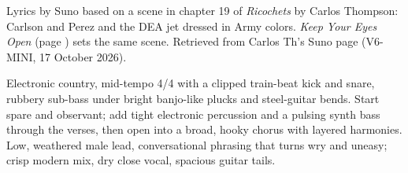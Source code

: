 
\label{sec:wrong-enough}
\begin{notes}
Lyrics by Suno based on a scene in chapter 19 of \emph{Ricochets} by Carlos Thompson: Carlson and Perez and the DEA jet dressed in Army colors. \emph{Keep Your Eyes Open} (page \pageref{sec:keep-your-eyes-open}) sets the same scene. Retrieved from Carlos Th's Suno page (V6-MINI, 17 October 2026).
\end{notes}
\begin{style}
Electronic country, mid-tempo 4/4 with a clipped train-beat kick and snare, rubbery sub-bass under bright banjo-like plucks and steel-guitar bends. Start spare and observant; add tight electronic percussion and a pulsing synth bass through the verses, then open into a broad, hooky chorus with layered harmonies. Low, weathered male lead, conversational phrasing that turns wry and uneasy; crisp modern mix, dry close vocal, spacious guitar tails.
\end{style}
